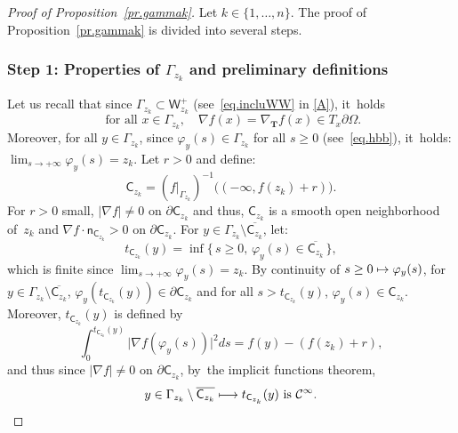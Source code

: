 \documentclass[JEP,XML,SOM,Unicode,NoEqCountersInSection,NoFloatCountersInSection,published]{cedram}
\newcommand\mto{\mathchoice{\longmapsto}{\mapsto}{\mapsto}{\mapsto}}
\newcommand{\mbf}[1]{\mathbf{#1}}
\let\pa\partial
\theoremstyle{plain}
\theoremstyle{definition}
\begin{document}
\label{sec:gammak}

\begin{proof}[Proof of Proposition~\ref{pr.gammak}]
Let $k\in \{1,\ldots,n\}$.
The proof of Proposition~\ref{pr.gammak} is divided into several steps.

\subsubsection*{Step 1: Properties of $\Gamma_{z_k}$ and preliminary definitions}
Let us recall that since $\Gamma_{z_k}\subset \mathsf W_{z_k}^+$ (see~\eqref{eq.incluWW} in \ref{A}), it~holds
\[
\text{ for all } x\in \Gamma_{z_k}, \quad \nabla f(x)=\nabla_{\mbf T}f(x) \in T_x\partial \Omega.
\]
Moreover, for all $y\in \Gamma_{z_k}$, since $\varphi_y(s)\in \Gamma_{z_k}$ for all $s\ge 0$ (see~\eqref{eq.hbb}), it~holds: $\lim_{s\to +\infty}\varphi_y(s)=z_k$.
Let $r>0$ and define:
\[
\mathsf C_{z_k} =(f|_{\Gamma_{z_k}})^{-1}\bigl((-\infty, f(z_k)+r)\bigr).
\]
For $r>0$ small, $\vert \nabla f\vert \neq 0$ on $\pa \mathsf C_{z_k}$ and thus, ${\mathsf C_{z_k}}$ is a smooth open neighborhood of~$z_k$ and $\nabla f \cdot \mathsf n_{\mathsf C_{z_k}}>0$ on $\pa \mathsf C_{z_k}$. For $y\in \Gamma_{z_k}\setminus \overline{ \mathsf C_{z_k} }$, let:
\begin{equation}\label{eq.sinf}
t_{\mathsf C_{z_k}}(y)=\inf\{\, s\ge 0, \, \varphi_{y}(s)\in \overline{\mathsf C_{z_k}}\, \},
\end{equation}
which is finite since $\lim_{s\to +\infty}\varphi_y(s)=z_k$.
By continuity of $s\ge 0\mto \varphi_y(s)$, for $y\in \Gamma_{z_k}\setminus \overline{ \mathsf C_{z_k} }$, $\varphi_y(t_{\mathsf C_{z_k}}(y))\in \pa \mathsf C_{z_k}$ and for all $s> t_{\mathsf C_{z_k}}(y)$, $\varphi_y(s)\in \mathsf C_{z_k}$. Moreover, $t_{\mathsf C_{z_k}}(y)$ is defined by
\[
\int_0^{t_{\mathsf C_{z_k}}(y)} \vert \nabla f(\varphi_y(s))\vert^2ds= f(y)-(f(z_k)+r),
\]
and thus since $\vert \nabla f\vert \neq 0$ on $\pa \mathsf C_{z_k}$, by~the implicit functions theorem,
\begin{equation}\label{eq.sinfregularite}
y\in \Gamma_{z_k} \setminus \overline{ \mathsf C_{z_k} } \mto t_{\mathsf C_{z_k}}(y) \text{ is } \mathcal C^\infty.
\end{equation}


\end{proof}
\end{document}
